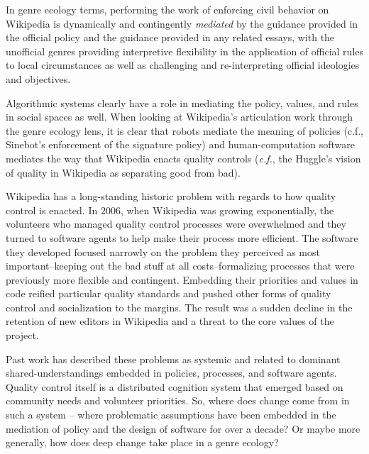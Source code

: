 In genre ecology terms, performing the work of enforcing civil behavior on Wikipedia is dynamically and contingently \emph{mediated} by the guidance provided in the official policy and the guidance provided in any related essays, with the unofficial genres providing interpretive flexibility in the application of official rules to local circumstances as well as challenging and re-interpreting official ideologies and objectives.

Algorithmic systems clearly have a role in mediating the policy, values, and rules in social spaces as well\cite{lessig1999code}.  When looking at Wikipedia's articulation work through the genre ecology lens, it is clear that robots mediate the meaning of policies (c.f., Sinebot's enforcement of the signature policy\cite{geiger2011lives}) and human-computation software mediates the way that Wikipedia enacts quality controls (\emph{c.f.}, the Huggle's vision of quality in Wikipedia as separating good from bad\cite{halfaker2014snuggle}).

  Wikipedia has a long-standing historic problem with regards to how quality control is enacted.  In 2006, when Wikipedia was growing exponentially, the volunteers who managed quality control processes were overwhelmed and they turned to software agents to help make their process more efficient\cite{halfaker2014snuggle}.  The software they developed focused narrowly on the problem they perceived as most important--keeping out the bad stuff at all costs--formalizing processes that were previously more flexible and contingent. Embedding their priorities and values in code reified particular quality standards and pushed other forms of quality control and socialization to the margins\cite{halfaker2013rise}.  The result was a sudden decline in the retention of new editors in Wikipedia and a threat to the core values of the project.

Past work has described these problems as systemic and related to dominant shared-understandings embedded in policies, processes, and software agents\cite{halfaker2014snuggle}.  Quality control itself is a distributed cognition system that emerged based on community needs and volunteer priorities\cite{geiger2010work}.  So, where does change come from in such a system -- where problematic assumptions have been embedded in the mediation of policy and the design of software for over a decade?  Or maybe more generally, how does deep change take place in a genre ecology?

